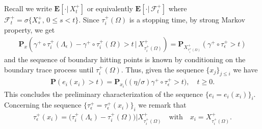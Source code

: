 \documentclass[11pt,a4paper]{article}
\begin{document}
{Recall we write $\mathbf{E}[\cdot |\, X^+_t]$ or equivalently $\mathbf{E}[\cdot | \, \mathcal{F}^+_t]$ where $\mathcal{F}^+_t = \sigma\{X^+_s,\, 0 \leq s < t\}$. Since $\tau^+_i(\Omega)$ is a stopping time, by strong Markov property, we get
\begin{align*}
\mathbf{P}_x(\gamma^+ \circ \tau^+_i(\Lambda_\epsilon) - \gamma^+ \circ \tau^+_i(\Omega) > t \, | \, X^+_{\tau^+_i (\Omega)}) = \mathbf{P}_{X^+_{ \tau^+_i(\Omega)}}(\gamma^+ \circ \tau^+_\epsilon >t)
\end{align*}
and the sequence of boundary hitting points is known by conditioning on the boundary trace process until $\tau^+_i(\Omega)$. Thus, given the sequence $\{x_j\}_{j \leq i}$ we have
\begin{align}
\mathbf{P}(e_i(x_i) > t) = \mathbf{P}_{x_i}\big((\eta/\sigma) \gamma^+ \circ \tau^+_\epsilon > t \big), \quad t \geq 0.
\label{SHTcharacterization}
\end{align} 
This concludes the preliminary characterization of the sequence $\{e_i=e_i(x_i)\}_i$. Concerning the sequence $\{\tau^+_\epsilon= \tau^+_\epsilon(x_i)\}_i$ we remark that
\begin{align}
\tau^+_\epsilon (x_i) = \big(\tau^+_i(\Lambda_\epsilon) - \tau^+_i(\Omega) \big) | X^+_{\tau^+_i(\Omega)} \quad \textrm{with} \quad x_i = X^+_{\tau^+_i(\Omega)}.
\label{EXITcharacterization}
\end{align}

}
\end{document}
